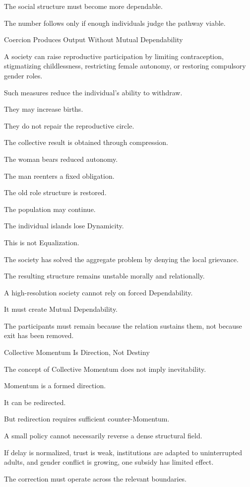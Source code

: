The social structure must become more dependable.

The number follows only if enough individuals judge the pathway viable.

Coercion Produces Output Without Mutual Dependability

A society can raise reproductive participation by limiting contraception, stigmatizing childlessness, restricting female autonomy, or restoring compulsory gender roles.

Such measures reduce the individual’s ability to withdraw.

They may increase births.

They do not repair the reproductive circle.

The collective result is obtained through compression.

The woman bears reduced autonomy.

The man reenters a fixed obligation.

The old role structure is restored.

The population may continue.

The individual islands lose Dynamicity.

This is not Equalization.

The society has solved the aggregate problem by denying the local grievance.

The resulting structure remains unstable morally and relationally.

A high-resolution society cannot rely on forced Dependability.

It must create Mutual Dependability.

The participants must remain because the relation sustains them, not because exit has been removed.

Collective Momentum Is Direction, Not Destiny

The concept of Collective Momentum does not imply inevitability.

Momentum is a formed direction.

It can be redirected.

But redirection requires sufficient counter-Momentum.

A small policy cannot necessarily reverse a dense structural field.

If delay is normalized, trust is weak, institutions are adapted to uninterrupted adults, and gender conflict is growing, one subsidy has limited effect.

The correction must operate across the relevant boundaries.

